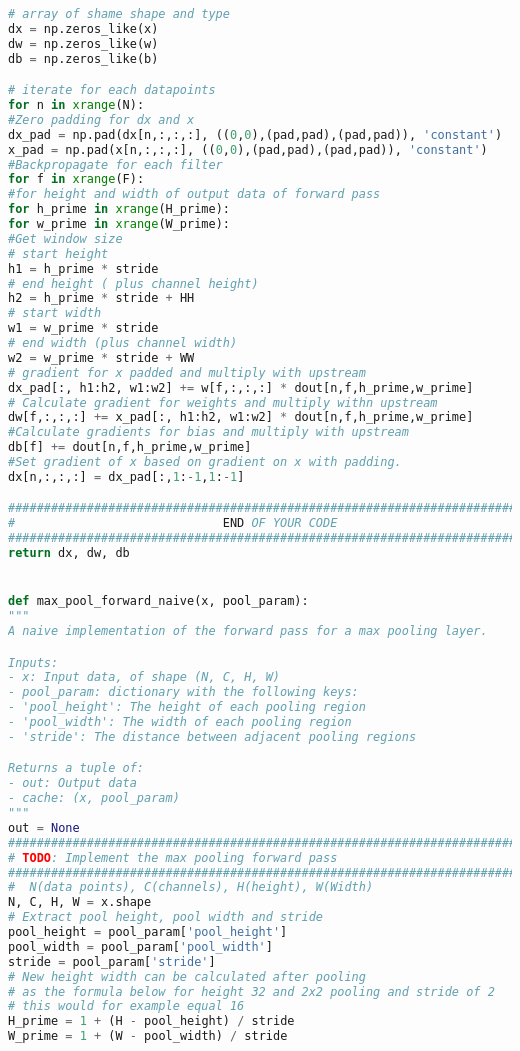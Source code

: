 \begin{lstlisting}[language=Python, label=lst:layers.py, caption={layers.py}, basicstyle=\tiny]
# array of shame shape and type
dx = np.zeros_like(x)
dw = np.zeros_like(w)
db = np.zeros_like(b)

# iterate for each datapoints
for n in xrange(N):   
#Zero padding for dx and x
dx_pad = np.pad(dx[n,:,:,:], ((0,0),(pad,pad),(pad,pad)), 'constant')
x_pad = np.pad(x[n,:,:,:], ((0,0),(pad,pad),(pad,pad)), 'constant')
#Backpropagate for each filter
for f in xrange(F):
#for height and width of output data of forward pass
for h_prime in xrange(H_prime):
for w_prime in xrange(W_prime):
#Get window size
# start height
h1 = h_prime * stride
# end height ( plus channel height)
h2 = h_prime * stride + HH
# start width
w1 = w_prime * stride
# end width (plus channel width)
w2 = w_prime * stride + WW
# gradient for x padded and multiply with upstream
dx_pad[:, h1:h2, w1:w2] += w[f,:,:,:] * dout[n,f,h_prime,w_prime]
# Calculate gradient for weights and multiply withn upstream
dw[f,:,:,:] += x_pad[:, h1:h2, w1:w2] * dout[n,f,h_prime,w_prime]
#Calculate gradients for bias and multiply with upstream
db[f] += dout[n,f,h_prime,w_prime]
#Set gradient of x based on gradient on x with padding.
dx[n,:,:,:] = dx_pad[:,1:-1,1:-1]

#############################################################################
#                             END OF YOUR CODE                              #
#############################################################################
return dx, dw, db


def max_pool_forward_naive(x, pool_param):
"""
A naive implementation of the forward pass for a max pooling layer.

Inputs:
- x: Input data, of shape (N, C, H, W)
- pool_param: dictionary with the following keys:
- 'pool_height': The height of each pooling region
- 'pool_width': The width of each pooling region
- 'stride': The distance between adjacent pooling regions

Returns a tuple of:
- out: Output data
- cache: (x, pool_param)
"""
out = None
#############################################################################
# TODO: Implement the max pooling forward pass                              #
#############################################################################
#  N(data points), C(channels), H(height), W(Width)
N, C, H, W = x.shape
# Extract pool height, pool width and stride
pool_height = pool_param['pool_height']
pool_width = pool_param['pool_width']
stride = pool_param['stride']
# New height width can be calculated after pooling
# as the formula below for height 32 and 2x2 pooling and stride of 2 
# this would for example equal 16
H_prime = 1 + (H - pool_height) / stride
W_prime = 1 + (W - pool_width) / stride


\end{lstlisting}
